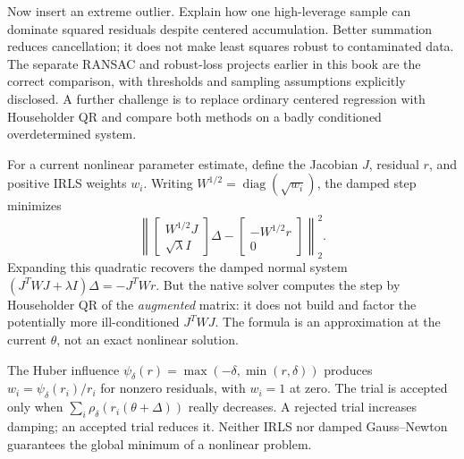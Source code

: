 \begin{booktwopitfall}
Now insert an extreme outlier. Explain how one high-leverage sample
can dominate squared residuals despite centered accumulation. Better
summation reduces cancellation; it does not make least squares robust
to contaminated data. The separate RANSAC and robust-loss projects
earlier in this book are the correct comparison, with thresholds and
sampling assumptions explicitly disclosed. A further challenge is to
replace ordinary centered regression with Householder QR and compare
both methods on a badly conditioned overdetermined system.

\end{booktwopitfall}


\begin{booktwoproof}
For a current nonlinear parameter estimate, define the Jacobian
\(J\), residual \(r\), and positive IRLS weights \(w_i\).
Writing \(W^{1/2}=\operatorname{diag}(\sqrt{w_i})\),
the damped step minimizes
\[
 \left\|\begin{bmatrix}W^{1/2}J\\ \sqrt{\lambda}I\end{bmatrix}
 \Delta-
 \begin{bmatrix}-W^{1/2}r\\0\end{bmatrix}\right\|_2^2.
\]
Expanding this quadratic recovers the damped
normal system \( (J^TWJ+\lambda I)\Delta=-J^TWr\).
But the native solver computes the step by Householder QR
of the \emph{augmented} matrix: it does not build and
factor the potentially more ill-conditioned \(J^TWJ\).
The formula is an approximation at the current \(\theta\),
not an exact nonlinear solution.

The Huber influence \(\psi_\delta(r)=
\max(-\delta,\min(r,\delta))\) produces
\(w_i=\psi_\delta(r_i)/r_i\) for nonzero residuals,
with \(w_i=1\) at zero. The trial is accepted only when
\(\sum_i\rho_\delta(r_i(\theta+\Delta))\) really decreases.
A rejected trial increases damping; an accepted trial
reduces it. Neither IRLS nor damped Gauss--Newton guarantees
the global minimum of a nonlinear problem.
\end{booktwoproof}

